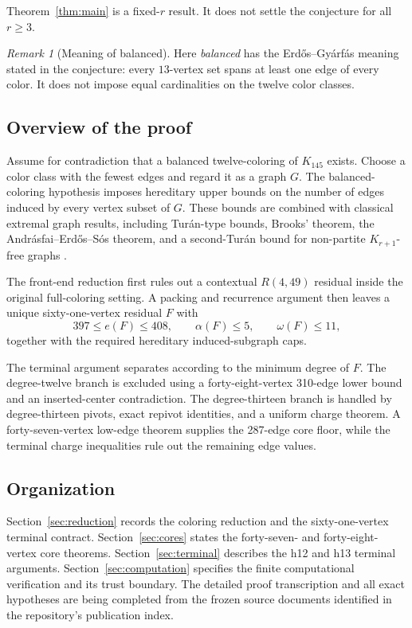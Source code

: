 \documentclass[11pt]{article}
\theoremstyle{definition}
\theoremstyle{remark}
\newtheorem{remark}{Remark}
\begin{document}
Theorem~\ref{thm:main} is a fixed-$r$ result. It does not settle the
conjecture for all $r\geq 3$.

\begin{remark}[Meaning of balanced]
Here \emph{balanced} has the Erd\H{o}s--Gy\'arf\'as meaning stated in the
conjecture: every $13$-vertex set spans at least one edge of every color.
It does not impose equal cardinalities on the twelve color classes.
\end{remark}

\subsection{Overview of the proof}

Assume for contradiction that a balanced twelve-coloring of $K_{145}$ exists.
Choose a color class with the fewest edges and regard it as a graph $G$.
The balanced-coloring hypothesis imposes hereditary upper bounds on the
number of edges induced by every vertex subset of $G$. These bounds are
combined with classical extremal graph results, including Tur\'an-type
bounds, Brooks' theorem, the Andr\'asfai--Erd\H{o}s--S\'os theorem, and a
second-Tur\'an bound for non-partite $K_{r+1}$-free graphs
\cite{Turan1941,Brooks1941,AndrasfaiErdosSos1974,KangPikhurko2005}.

The front-end reduction first rules out a contextual $R(4,49)$ residual
inside the original full-coloring setting. A packing and recurrence argument
then leaves a unique sixty-one-vertex residual $F$ with
\[
  397\leq e(F)\leq 408,\qquad
  \alpha(F)\leq 5,\qquad \omega(F)\leq 11,
\]
together with the required hereditary induced-subgraph caps.

The terminal argument separates according to the minimum degree of $F$.
The degree-twelve branch is excluded using a forty-eight-vertex
310-edge lower bound and an inserted-center contradiction. The degree-thirteen
branch is handled by degree-thirteen pivots, exact repivot identities, and a
uniform charge theorem. A forty-seven-vertex low-edge theorem supplies the
287-edge core floor, while the terminal charge inequalities rule out the
remaining edge values.

\subsection{Organization}

Section~\ref{sec:reduction} records the coloring reduction and the
sixty-one-vertex terminal contract. Section~\ref{sec:cores} states the
forty-seven- and forty-eight-vertex core theorems. Section~\ref{sec:terminal}
describes the h12 and h13 terminal arguments. Section~\ref{sec:computation}
specifies the finite computational verification and its trust boundary.
The detailed proof transcription and all exact hypotheses are being
completed from the frozen source documents identified in the repository's
publication index.
\end{document}
